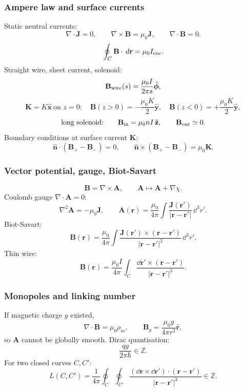 \subsubsection*{Ampere law and surface currents}
Static neutral currents:
\[
\nabla\cdot\mathbf J=0,\qquad
\boxed{\nabla\times\mathbf B=\mu_0\mathbf J},\qquad
\boxed{\nabla\cdot\mathbf B=0}.
\]
\[
\oint_C\mathbf B\cdot\,d\mathbf r=\mu_0I_{\rm enc}.
\]
Straight wire, sheet current, solenoid:
\[
\mathbf B_{\rm wire}(s)=\frac{\mu_0I}{2\pi s}\hat{\boldsymbol\phi},
\]
\[
\mathbf K=K\hat{\mathbf x}\ \text{on }z=0:\quad
\mathbf B(z>0)=-\frac{\mu_0K}{2}\hat{\mathbf y},\quad
\mathbf B(z<0)=+\frac{\mu_0K}{2}\hat{\mathbf y},
\]
\[
\text{long solenoid:}\qquad \mathbf B_{\rm in}=\mu_0nI\,\hat{\mathbf z},\qquad
\mathbf B_{\rm out}\simeq0.
\]
Boundary conditions at surface current $\mathbf K$:
\[
\boxed{\hat{\mathbf n}\cdot(\mathbf B_+-\mathbf B_-)=0},\qquad
\boxed{\hat{\mathbf n}\times(\mathbf B_+-\mathbf B_-)=\mu_0\mathbf K}.
\]

\subsubsection*{Vector potential, gauge, Biot-Savart}
\[
\boxed{\mathbf B=\nabla\times\mathbf A},\qquad
\mathbf A\mapsto\mathbf A+\nabla\chi.
\]
Coulomb gauge $\nabla\cdot\mathbf A=0$:
\[
\boxed{\nabla^2\mathbf A=-\mu_0\mathbf J},\qquad
\boxed{\mathbf A(\mathbf r)=\frac{\mu_0}{4\pi}
\int\frac{\mathbf J(\mathbf r')}{|\mathbf r-\mathbf r'|}\,\dd^3r'}.
\]
Biot-Savart:
\[
\boxed{\mathbf B(\mathbf r)=\frac{\mu_0}{4\pi}\int
\frac{\mathbf J(\mathbf r')\times(\mathbf r-\mathbf r')}
{|\mathbf r-\mathbf r'|^3}\,\dd^3r'}.
\]
Thin wire:
\[
\mathbf B(\mathbf r)=\frac{\mu_0I}{4\pi}\int_C
\frac{\dd\mathbf r'\times(\mathbf r-\mathbf r')}{|\mathbf r-\mathbf r'|^3}.
\]

\subsubsection*{Monopoles and linking number}
If magnetic charge $g$ existed,
\[
\nabla\cdot\mathbf B=\mu_0\rho_m,\qquad
\mathbf B_g=\frac{\mu_0g}{4\pi r^2}\hat{\mathbf r},
\]
so $\mathbf A$ cannot be globally smooth. Dirac quantisation:
\[
\boxed{\frac{qg}{2\pi\hbar}\in\mathbb Z}.
\]
For two closed curves $C,C'$:
\[
\boxed{L(C,C')=\frac{1}{4\pi}\oint_C\oint_{C'}
\frac{(\dd\mathbf r\times\dd\mathbf r')\cdot(\mathbf r-\mathbf r')}
{|\mathbf r-\mathbf r'|^3}\in\mathbb Z}.
\]

